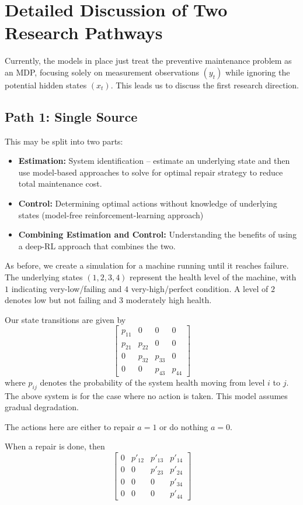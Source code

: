 \documentclass[english]{article}
\numberwithin{equation}{section}
\begin{document}
	\section*{Detailed Discussion of Two Research Pathways}
	Currently, the models in place just treat the preventive maintenance problem as an MDP, focusing solely on measurement observations $(y_t)$ while ignoring the potential hidden states $(x_t)$. This leads us to discuss the first research direction.
	\subsection*{Path 1: Single Source}
	This may be split into two parts:
	
	\begin{itemize}
		\item \textbf{Estimation:} System identification -- estimate an underlying state and then use model-based approaches to solve for optimal repair strategy to reduce total maintenance cost.
		\item \textbf{Control:} Determining optimal actions without knowledge of underlying states (model-free reinforcement-learning approach)
		\item \textbf{Combining Estimation and Control:} Understanding the benefits of using a deep-RL approach that combines the two.
	\end{itemize}
	
	
	As before, we create a simulation for a machine running until it reaches failure. The underlying states $(1,2,3,4)$ represent the health level of the machine, with $1$ indicating very-low/failing and $4$ very-high/perfect condition. A level of $2$ denotes low but not failing and $3$ moderately high health.
	
	Our state transitions are given by 
	$$
	\begin{bmatrix}
	p_{11} & 0 & 0 & 0 \\
	p_{21} & p_{22} & 0 & 0 \\
	0 & p_{32} & p_{33} & 0 \\
	0 & 0 & p_{43} & p_{44}
	\end{bmatrix}
	$$
	where $p_{ij}$ denotes the probability of the system health moving from level $i$ to $j$. The above system is for the case where no action is taken. This model assumes gradual degradation.
	
	The actions here are either to repair $a=1$ or do nothing $a=0$.
	
	When a repair is done, then
	$$
	\begin{bmatrix}
	0 & p'_{12} & p'_{13} & p'_{14} \\
	0 & 0 & p'_{23} & p'_{24} \\
	0 & 0 & 0 & p'_{34} \\
	0 & 0 & 0 & p'_{44}
	\end{bmatrix}
	$$
	
\end{document}
